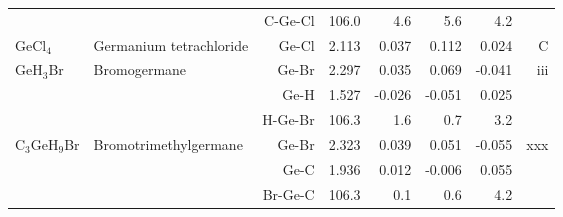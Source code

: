 \begin{table}
\begin{center}
\begin{tabular}{llrrrrrr}
             &                                    &C-Ge-Cl      &     106.0   &       4.6 &       5.6 &       4.2   &       \\
 GeCl$_4$       & Germanium tetrachloride            &Ge-Cl          &     2.113   &     0.037 &     0.112 &     0.024 &     C \\
 GeH$_3$Br      & Bromogermane                       &Ge-Br          &     2.297   &     0.035 &     0.069 &    -0.041 &   iii \\
             &                                    &Ge-H           &     1.527   &    -0.026 &    -0.051 &     0.025 &       \\
             &                                    &H-Ge-Br      &     106.3   &       1.6 &       0.7 &       3.2   &       \\
 C$_3$GeH$_9$Br    & Bromotrimethylgermane              &Ge-Br          &     2.323   &     0.039 &     0.051 &    -0.055 &   xxx \\
             &                                    &Ge-C           &     1.936   &     0.012 &    -0.006 &     0.055 &       \\
             &                                    &Br-Ge-C      &     106.3   &       0.1 &       0.6 &       4.2   &       \\
\hline
\end{tabular}
\end{center}
\end{table}
\clearpage

